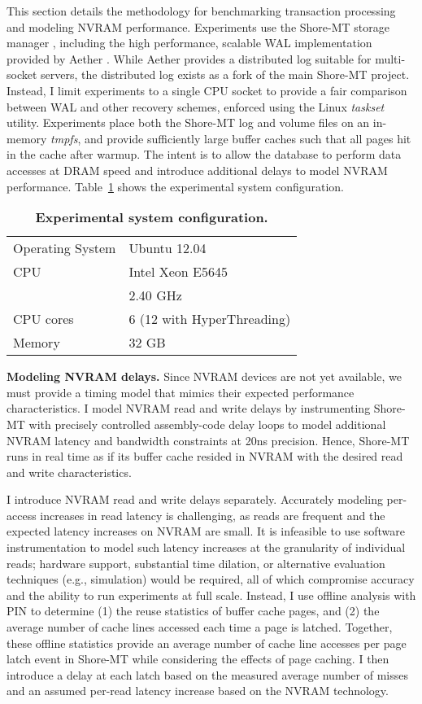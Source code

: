 This section details the methodology for benchmarking transaction processing and modeling NVRAM performance.
Experiments use the Shore-MT storage manager \cite{JohnsonPandis09}, including the high performance, scalable WAL implementation provided by Aether \cite{JohnsonPandis10}.
While Aether provides a distributed log suitable for multi-socket servers, the distributed log exists as a fork of the main Shore-MT project.
Instead, I limit experiments to a single CPU socket to provide a fair comparison between WAL and other recovery schemes, enforced using the Linux \emph{taskset} utility.
Experiments place both the Shore-MT log and volume files on an in-memory \emph{tmpfs}, and provide sufficiently large buffer caches such that all pages hit in the cache after warmup.
The intent is to allow the database to perform data accesses at DRAM speed and introduce additional delays to model NVRAM performance.
Table~\ref{table::Specs} shows the experimental system configuration.

\begin{table}
  \centering
  \begin{tabular}{l l}
    \hline
    Operating System & Ubuntu 12.04 \\
    CPU & Intel Xeon E5645 \\
    & 2.40 GHz \\
    CPU cores & 6 (12 with HyperThreading) \\
    Memory & 32 GB \\
    \hline
  \end{tabular}
  \caption{\textbf{Experimental system configuration.}}
  \label{table::Specs}
\end{table}

\textbf{Modeling NVRAM delays.}
Since NVRAM devices are not yet available, we must provide a timing model that mimics their expected performance characteristics.
I model NVRAM read and write delays by instrumenting Shore-MT with precisely controlled assembly-code delay loops to model additional NVRAM latency and bandwidth constraints at 20ns precision.
Hence, Shore-MT runs in real time as if its buffer cache resided in NVRAM with the desired read and write characteristics.

I introduce NVRAM read and write delays separately.
Accurately modeling per-access increases in read latency is challenging, as reads are frequent and the expected latency increases on NVRAM are small.
It is infeasible to use software instrumentation to model such latency increases at the granularity of individual reads; hardware support, substantial time dilation, or alternative evaluation techniques (e.g., simulation) would be required, all of which compromise accuracy and the ability to run experiments at full scale.
Instead, I use offline analysis with PIN \cite{LukCohn05} to determine (1) the reuse statistics of buffer cache pages, and (2) the average number of cache lines accessed each time a page is latched.
Together, these offline statistics provide an average number of cache line accesses per page latch event in Shore-MT while considering the effects of page caching.
I then introduce a delay at each latch based on the measured average number of misses and an assumed per-read latency increase based on the NVRAM technology.

